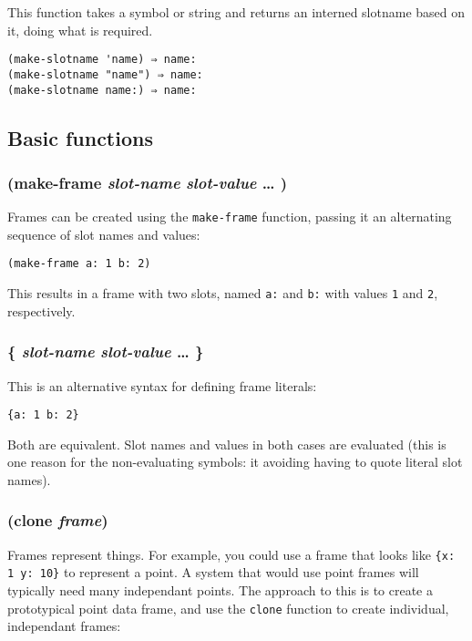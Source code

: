 \documentclass{article}
\begin{document}
This function takes a symbol or string and returns an interned slotname based on it, doing
what is required.

\begin{verbatim}
(make-slotname 'name) ⇒ name:
(make-slotname "name") ⇒ name:
(make-slotname name:) ⇒ name:
\end{verbatim}

\subsection{Basic functions}\label{sec:basic-functions}

\subsubsection{(make-frame \emph{slot-name} \emph{slot-value} \ldots{} )}

Frames can be created using the \verb|make-frame| function, passing it an alternating
sequence of slot names and values:

\begin{verbatim}
(make-frame a: 1 b: 2)
\end{verbatim}

This results in a frame with two slots, named \verb|a:| and \verb|b:| with values
\verb|1| and \verb|2|, respectively.

\subsubsection{\{ \emph{slot-name} \emph{slot-value} \ldots{} \}}

This is an alternative syntax for defining frame literals:

\begin{verbatim}
{a: 1 b: 2}
\end{verbatim}

Both are equivalent. Slot names and values in both cases are evaluated (this is one reason for
the non-evaluating symbols: it avoiding having to quote literal slot names).

\subsubsection{(clone \emph{frame})}

Frames represent things. For example, you could use a frame that looks like
\verb|{x: 1 y: 10}| to represent a point. A system that would use point frames will typically
need many independant points. The approach to this is to create a prototypical point data
frame, and use the \verb|clone| function to create individual, independant frames:
\end{document}
